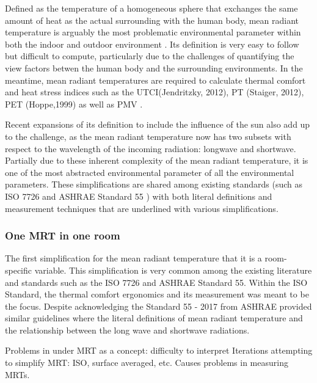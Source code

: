     Defined as the temperature of a homogeneous sphere that exchanges the same amount of heat as the actual surrounding with the human body, mean radiant temperature is arguably the most problematic environmental parameter within both the indoor and outdoor environment \cite{kantor_most_2011}. Its definition is very easy to follow but difficult to compute, particularly due to the challenges of quantifying the view factors betwen the human body and the surrounding environments. In the meantime, mean radiant temperatures are required to calculate thermal comfort and heat stress indices such as the UTCI(Jendritzky, 2012), PT (Staiger, 2012), PET (Hoppe,1999) as well as PMV \cite{fanger_calculation_1967}. 

    Recent expansions of its definition to include the influence of the sun also add up to the challenge, as the mean radiant temperature now has two subsets with respect to the wavelength of the incoming radiation: longwave and shortwave\cite{ansi/ashrae_standard_2017}. Partially due to these inherent complexity of the mean radiant temperature, it is one of the most abstracted environmental parameter of all the environmental parameters. These simplifications are shared among existing standards (such as ISO 7726 \cite{standardization_iso7726_2001} and ASHRAE Standard 55 \cite{ansi/ashrae_standard_2017}) with both literal definitions and measurement techniques that are underlined with various simplifications. 
    \subsubsection{One MRT in one room}
    The first simplification for the mean radiant temperature that it is a room-specific variable. This simplification is very common among the existing literature and standards such as the ISO 7726\cite{standardization_iso7726_2001} and ASHRAE Standard 55. Within the ISO Standard, the thermal comfort ergonomics and its measurement was meant to be the focus. Despite acknowledging the  Standard 55 - 2017 from ASHRAE provided similar guidelines where the literal definitions of mean radiant temperature and the relationship between the long wave and shortwave radiations. 

    Problems in under MRT as a concept: difficulty to interpret Iterations attempting to simplify MRT: ISO, surface averaged, etc. Causes problems in measuring MRTs.

